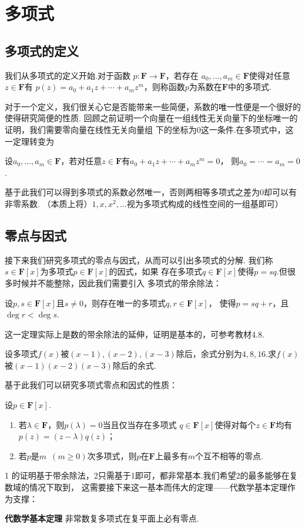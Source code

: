 \chapter{多项式}

\section{多项式的定义}

我们从多项式的定义开始.对于函数 $p:\mathbf{F}\to\mathbf{F}$，若存在
$a_0,\ldots,a_m\in\mathbf{F}$使得对任意$z\in\mathbf{F}$有
$p(z)=a_0+a_1z+\cdots+a_mz^m$，则称函数$p$为系数在$\mathbf{F}$中的多项式.

对于一个定义，我们很关心它是否能带来一些简便，系数的唯一性便是一个很好的使得研究简便的性质.
回顾之前证明一个向量在一组线性无关向量下的坐标唯一的证明，我们需要零向量在线性无关向量组
下的坐标为0这一条件.在多项式中，这一定理转变为
\begin{theorem}
    设$a_0,\ldots,a_m\in\mathbf{F}$，若对任意$z\in\mathbf{F}$有$a_0+a_1z+\cdots+a_mz^m=0$，
    则$a_0=\cdots=a_m=0$.
\end{theorem}
基于此我们可以得到多项式的系数必然唯一，否则两相等多项式之差为0却可以有非零系数.
（本质上将）$1,x,x^2,\ldots$视为多项式构成的线性空间的一组基即可）

\section{零点与因式}

接下来我们研究多项式的零点与因式，从而可以引出多项式的分解.
我们称$s\in\mathbf{F}[x]$为多项式$p\in\mathbf{F}[x]$的因式，如果
存在多项式$q\in\mathbf{F}[x]$使得$p=sq$.但很多时候并不能整除，因此我们需要引入
多项式的带余除法：
\begin{theorem}
    设$p,s\in\mathbf{F}[x]$且$s\neq 0$，则存在唯一的多项式$q,r\in\mathbf{F}[x]$，
    使得$p=sq+r$，且$\deg r<\deg s$.
\end{theorem}
这一定理实际上是数的带余除法的延伸，证明是基本的，可参考教材4.8.
\begin{example}
    设多项式$f(x)$被$(x-1),(x-2),(x-3)$除后，余式分别为$4,8,16$.求$f(x)$被$(x-1)(x-2)(x-3)$除后的余式.
\end{example}
基于此我们可以研究多项式零点和因式的性质：
\begin{theorem}
    设$p\in\mathbf{F}[x]$.
    \begin{enumerate}
        \item 若$\lambda\in\mathbf{F}$，则$p(\lambda)=0$当且仅当存在多项式
            $q\in\mathbf{F}[x]$使得对每个$z\in\mathbf{F}$均有$p(z)=(z-\lambda)q(z)$；

        \item 若$p$是$m\enspace(m \geqslant 0)$次多项式，则$p$在$\mathbf{F}$上最多有$m$个互不相等的零点.
    \end{enumerate}
\end{theorem}
1 的证明基于带余除法，2只需基于1即可，都非常基本.我们希望2的最多能够在复数域的情况下取到，
这需要接下来这一基本而伟大的定理——代数学基本定理作为支撑：
\begin{theorem} \textbf{\heiti 代数学基本定理} \label{thm:14:代数学基本定理}
    非常数复多项式在复平面上必有零点.
\end{theorem}


